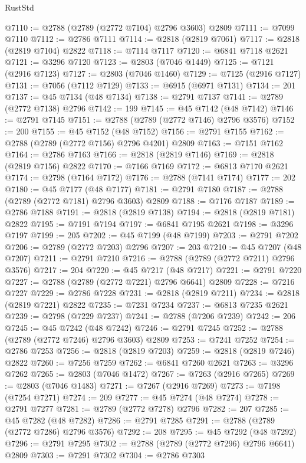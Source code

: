 \begin{lexlean}{RustStd}
\begin{coremodule}
@7110 := @2788 (@2789 (@2772 @7104) @2796 @3603) @2809
@7111 := @7099 @7110
@7112 := @2786 @7111
@7114 := @2818 (@2819 @7061)
@7117 := @2818 (@2819 @7104) @2822
@7118 := @7114 @7117
@7120 := @6841 @7118 @2621
@7121 := @3296 @7120
@7123 := @2803 (@7046 @1449)
@7125 := @7121 (@2916 @7123)
@7127 := @2803 (@7046 @1460)
@7129 := @7125 (@2916 @7127)
@7131 := @7056 (@7112 @7129)
@7133 := @6915 (@6971 @7131)
@7134 := 201
@7137 := @45 @7134 (@48 @7134)
@7138 := @2791 @7137
@7141 := @2789 (@2772 @7138) @2796
@7142 := 199
@7145 := @45 @7142 (@48 @7142)
@7146 := @2791 @7145
@7151 := @2788 (@2789 (@2772 @7146) @2796 @3576)
@7152 := 200
@7155 := @45 @7152 (@48 @7152)
@7156 := @2791 @7155
@7162 := @2788 (@2789 (@2772 @7156) @2796 @4201) @2809
@7163 := @7151 @7162
@7164 := @2786 @7163
@7166 := @2818 (@2819 @7146)
@7169 := @2818 (@2819 @7156) @2822
@7170 := @7166 @7169
@7172 := @6813 @7170 @2621
@7174 := @2798 (@7164 @7172)
@7176 := @2788 (@7141 @7174)
@7177 := 202
@7180 := @45 @7177 (@48 @7177)
@7181 := @2791 @7180
@7187 := @2788 (@2789 (@2772 @7181) @2796 @3603) @2809
@7188 := @7176 @7187
@7189 := @2786 @7188
@7191 := @2818 (@2819 @7138)
@7194 := @2818 (@2819 @7181) @2822
@7195 := @7191 @7194
@7197 := @6841 @7195 @2621
@7198 := @3296 @7197
@7199 := 205
@7202 := @45 @7199 (@48 @7199)
@7203 := @2791 @7202
@7206 := @2789 (@2772 @7203) @2796
@7207 := 203
@7210 := @45 @7207 (@48 @7207)
@7211 := @2791 @7210
@7216 := @2788 (@2789 (@2772 @7211) @2796 @3576)
@7217 := 204
@7220 := @45 @7217 (@48 @7217)
@7221 := @2791 @7220
@7227 := @2788 (@2789 (@2772 @7221) @2796 @6641) @2809
@7228 := @7216 @7227
@7229 := @2786 @7228
@7231 := @2818 (@2819 @7211)
@7234 := @2818 (@2819 @7221) @2822
@7235 := @7231 @7234
@7237 := @6813 @7235 @2621
@7239 := @2798 (@7229 @7237)
@7241 := @2788 (@7206 @7239)
@7242 := 206
@7245 := @45 @7242 (@48 @7242)
@7246 := @2791 @7245
@7252 := @2788 (@2789 (@2772 @7246) @2796 @3603) @2809
@7253 := @7241 @7252
@7254 := @2786 @7253
@7256 := @2818 (@2819 @7203)
@7259 := @2818 (@2819 @7246) @2822
@7260 := @7256 @7259
@7262 := @6841 @7260 @2621
@7263 := @3296 @7262
@7265 := @2803 (@7046 @1472)
@7267 := @7263 (@2916 @7265)
@7269 := @2803 (@7046 @1483)
@7271 := @7267 (@2916 @7269)
@7273 := @7198 (@7254 @7271)
@7274 := 209
@7277 := @45 @7274 (@48 @7274)
@7278 := @2791 @7277
@7281 := @2789 (@2772 @7278) @2796
@7282 := 207
@7285 := @45 @7282 (@48 @7282)
@7286 := @2791 @7285
@7291 := @2788 (@2789 (@2772 @7286) @2796 @3576)
@7292 := 208
@7295 := @45 @7292 (@48 @7292)
@7296 := @2791 @7295
@7302 := @2788 (@2789 (@2772 @7296) @2796 @6641) @2809
@7303 := @7291 @7302
@7304 := @2786 @7303

\end{coremodule}
\end{lexlean}
